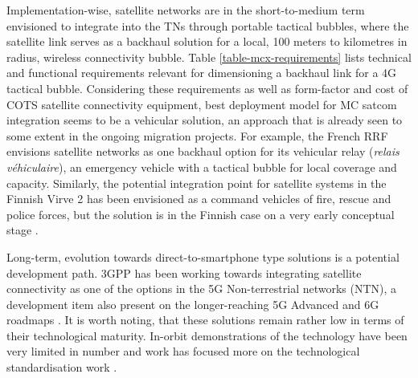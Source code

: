 \documentclass[english, 12pt, a4paper, elec, utf8, a-1b, online]{aaltothesis}
\begin{document}
Implementation-wise, satellite networks are in the short-to-medium term envisioned to integrate into the TNs through portable tactical bubbles, where the satellite link serves as a backhaul solution for a local, 100 meters to kilometres in radius, wireless connectivity bubble.
Table \ref{table-mcx-requirements} lists technical and functional requirements relevant for dimensioning a backhaul link for a 4G tactical bubble.
Considering these requirements as well as form-factor and cost of COTS satellite connectivity equipment, best deployment model for MC satcom integration seems to be a vehicular solution, an approach that is already seen to some extent in the ongoing migration projects.
For example, the French RRF envisions satellite networks as one backhaul option for its vehicular relay (\textit{relais véhiculaire}), an emergency vehicle with a tactical bubble for local coverage and capacity.
Similarly, the potential integration point for satellite systems in the Finnish Virve 2 has been envisioned as a command vehicles of fire, rescue and police forces, but the solution is in the Finnish case on a very early conceptual stage \cite{kokkoniemitarkkanen2024missioncritical,saynevirta2021satellite,dominguez2021resilience}. 

Long-term, evolution towards direct-to-smartphone type solutions is a potential development path. 3GPP has been working towards integrating satellite connectivity as one of the options in the 5G Non-terrestrial networks (NTN), a development item also present on the longer-reaching 5G Advanced and 6G roadmaps \cite{ray2021perspective, jiang2021road}. It is worth noting, that these solutions remain rather low in terms of their technological maturity. In-orbit demonstrations of the technology have been very limited in number and work has focused more on the technological standardisation work \cite{sn-2023-09-19-ast, sn-2023-11-07-lynk, 5g-americas-update-on-5g-ntn, jain2023rel18}.
\end{document}
